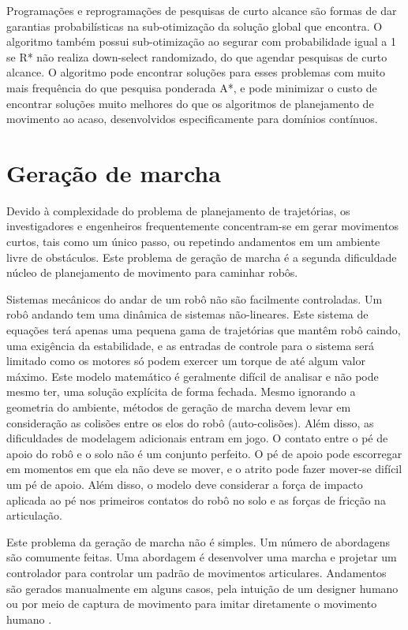 \documentclass[font=plain]{abnt}
\begin{document}
Programações e reprogramações de pesquisas de curto alcance são formas de dar garantias probabilísticas na sub-otimização da solução global que encontra. 
O algoritmo também possui sub-otimização ao segurar com probabilidade igual a 1 se R* não realiza down-select randomizado, do que agendar pesquisas de curto 
alcance. O algoritmo pode encontrar soluções para esses problemas com muito mais frequência do que pesquisa ponderada A*, e pode minimizar o custo de
encontrar soluções muito melhores do que os algoritmos de planejamento de movimento ao acaso, desenvolvidos especificamente para domínios contínuos.

\section{Geração de marcha}
Devido à complexidade do problema de planejamento de trajetórias, os investigadores e engenheiros frequentemente concentram-se 
em gerar movimentos curtos, tais como um único passo, ou repetindo andamentos em um ambiente livre de obstáculos. Este problema 
de geração de marcha é a segunda dificuldade núcleo de planejamento de movimento para caminhar robôs.

Sistemas mecânicos do andar de um robô não são facilmente controladas. Um robô andando tem uma dinâmica de sistemas não-lineares. 
Este sistema de equações terá apenas uma pequena gama de trajetórias que mantêm robô caindo, uma exigência da estabilidade, e as 
entradas de controle para o sistema será limitado como os motores só podem exercer um torque de até algum valor máximo. Este modelo 
matemático é geralmente difícil de analisar e não pode mesmo ter, uma solução explícita de forma fechada. Mesmo ignorando a geometria 
do ambiente, métodos de geração de marcha devem levar em consideração as colisões entre os elos do robô (auto-colisões). Além disso, 
as dificuldades de modelagem adicionais entram em jogo. O contato entre o pé de apoio do robô  e o solo não é um conjunto perfeito. O 
pé de apoio pode escorregar em momentos em que ela não deve se mover, e o atrito pode fazer mover-se difícil um pé de apoio. Além 
disso, o modelo deve considerar a força de impacto aplicada ao pé nos primeiros contatos do robô no solo e as forças de fricção na articulação.

Este problema da geração de marcha não é simples. Um número de abordagens são comumente feitas. Uma abordagem é desenvolver uma marcha
e projetar um controlador para controlar um padrão de movimentos articulares. Andamentos são gerados manualmente em alguns casos, pela
intuição de um designer humano ou por meio de captura de movimento para imitar diretamente o movimento humano \cite{bchoi}. 
\end{document}

